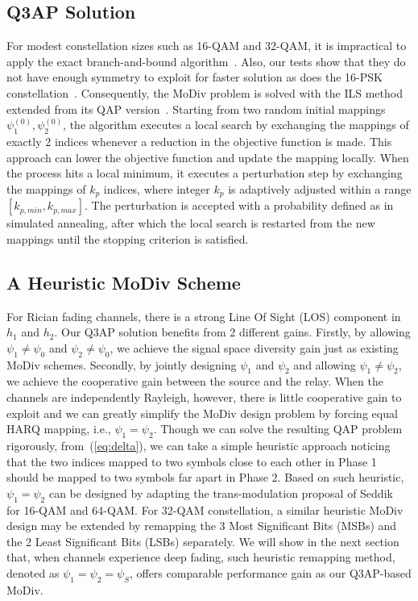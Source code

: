 \documentclass[journal]{IEEEtran}
\begin{document}
\subsection{Q3AP Solution}
For modest constellation sizes such as 16-QAM and 32-QAM, it is impractical
to apply the exact branch-and-bound algorithm~\cite{hahn2008quadratic}. Also,
our tests show that they do not have enough symmetry to exploit for faster
solution as does the 16-PSK constellation~\cite{mittelmann2015solving}.
Consequently, the MoDiv problem is solved with the ILS
method~\cite{hahn2008quadratic} extended from its QAP
version~\cite{stutzle2006iterated}. Starting from two random initial mappings
$\psi_1^{(0)}, \psi_2^{(0)}$, the algorithm executes a local search by
exchanging the mappings of exactly 2 indices whenever a reduction in the
objective function is made. This approach can lower the objective function and
update the mapping locally. When the process hits a local minimum, it executes a
perturbation step by exchanging the mappings of $k_p$ indices, where integer
$k_p$ is adaptively adjusted within a range $[k_{p,min}, k_{p,max}]$. The
perturbation is accepted with a probability defined as in simulated annealing, after which the
local search is restarted from the new mappings until the stopping criterion is
satisfied.

\subsection{A Heuristic MoDiv Scheme}
\label{sec:heuristic}
For Rician fading channels, there is a strong Line Of Sight (LOS) component in
$h_1$ and $h_2$. Our Q3AP solution benefits from 2 different gains. Firstly, by
allowing $\psi_1\not=\psi_0$ and $\psi_2\not=\psi_0$, we achieve the signal
space diversity gain just as existing MoDiv schemes. Secondly, by jointly
designing $\psi_1$ and $\psi_2$ and allowing $\psi_1\not=\psi_2$, we achieve the
cooperative gain between the source and the relay. When the channels are
independently Rayleigh, however, there is little cooperative gain to exploit and
we can greatly simplify the MoDiv design problem by forcing equal HARQ mapping,
i.e., $\psi_1=\psi_2$.
Though we can solve the resulting QAP problem rigorously, from~(\ref{eq:delta}),
we can take a simple heuristic approach noticing that the two indices mapped to
two symbols close to each other in Phase 1 should be mapped to two symbols far
apart in Phase 2. Based on such heuristic, $\psi_1=\psi_2$ can be designed by
adapting the trans-modulation proposal of Seddik~\cite{seddik2008trans} for
16-QAM and 64-QAM. For 32-QAM constellation, a similar heuristic MoDiv design may be
extended by remapping the 3 Most Significant Bits (MSBs) and the 2 Least
Significant Bits (LSBs) separately. We will show in the next section that, when
channels experience deep fading, such heuristic remapping method, denoted as
$\psi_1 = \psi_2 = \psi_S$, offers comparable performance gain as our Q3AP-based
MoDiv.
\end{document}
